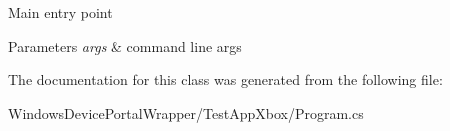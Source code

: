 Main entry point 


\begin{DoxyParams}{Parameters}
{\em args} & command line args\\
\hline
\end{DoxyParams}


The documentation for this class was generated from the following file\+:\begin{DoxyCompactItemize}
\item 
Windows\+Device\+Portal\+Wrapper/\+Test\+App\+Xbox/Program.\+cs\end{DoxyCompactItemize}

